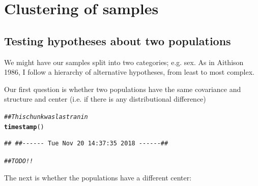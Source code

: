 \documentclass{article}\usepackage[]{graphicx}\usepackage[]{color}
\makeatletter
\newcommand{\hlcom}[1]{\textcolor[rgb]{0.678,0.584,0.686}{\textit{#1}}}%
\newcommand{\hlstd}[1]{\textcolor[rgb]{0.345,0.345,0.345}{#1}}%
\newcommand{\hlkwd}[1]{\textcolor[rgb]{0.737,0.353,0.396}{\textbf{#1}}}%
\newenvironment{kframe}{%
 \def\at@end@of@kframe{}%
 \ifinner\ifhmode%
  \def\at@end@of@kframe{\end{minipage}}%
  \begin{minipage}{\columnwidth}%
 \fi\fi%
 \def\FrameCommand##1{\hskip\@totalleftmargin \hskip-\fboxsep
 \colorbox{shadecolor}{##1}\hskip-\fboxsep
     \hskip-\linewidth \hskip-\@totalleftmargin \hskip\columnwidth}%
 \MakeFramed {\advance\hsize-\width
   \@totalleftmargin\z@ \linewidth\hsize
   \@setminipage}}%
 {\par\unskip\endMakeFramed%
 \at@end@of@kframe}
\newenvironment{knitrout}{}{} %
\makeatother
\begin{document}
\section{Clustering of samples}



\clearpage

\subsection{Testing hypotheses about two populations}
We might have our samples split into two categories; e.g. sex. As in Aithison 1986\cite{}, I follow a hierarchy of alternative hypotheses, from least to most complex.

Our first question is whether two populations have the same covariance and structure and center (i.e. if there is any distributional difference)

\begin{knitrout}
\color{fgcolor}\begin{kframe}
\begin{alltt}
\hlcom{## This chunk was last ran in}
\hlkwd{timestamp}\hlstd{()}
\end{alltt}
\begin{verbatim}
## ##------ Tue Nov 20 14:37:35 2018 ------##
\end{verbatim}
\begin{alltt}
\hlcom{##TODO!!}
\end{alltt}
\end{kframe}
\end{knitrout}

The next is whether the populations have a different center:
\end{document}
